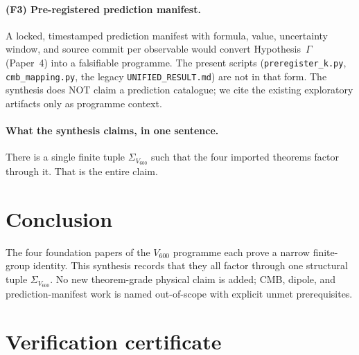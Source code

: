 \documentclass[11pt]{article}
\theoremstyle{remark}
\newcommand{\Vsixhundred}{V_{600}}
\newcommand{\Sigmaspine}{\Sigma_{\Vsixhundred}}
\begin{document}
\paragraph{(F3) Pre-registered prediction manifest.}
A locked, timestamped prediction manifest with formula, value,
uncertainty window, and source commit per observable would convert
Hypothesis~$\Gamma$ (Paper~4) into a falsifiable programme. The
present scripts (\texttt{preregister\_k.py},
\texttt{cmb\_mapping.py}, the legacy
\texttt{UNIFIED\_RESULT.md}) are not in that form. The synthesis
does NOT claim a prediction catalogue; we cite the existing
exploratory artifacts only as programme context.

\paragraph{What the synthesis claims, in one sentence.}
There is a single finite tuple $\Sigmaspine$ such that the four
imported theorems factor through it. That is the entire claim.

\section{Conclusion}\label{sec:concl}

The four foundation papers of the $\Vsixhundred$ programme each
prove a narrow finite-group identity. This synthesis records that
they all factor through one structural tuple $\Sigmaspine$. No
new theorem-grade physical claim is added; CMB, dipole, and
prediction-manifest work is named out-of-scope with explicit unmet
prerequisites.

\appendix

\section{Verification certificate}\label{app:verify}
\end{document}
